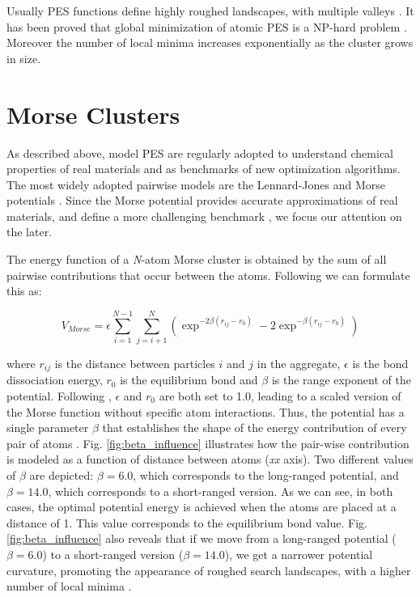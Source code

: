 Usually PES functions define highly roughed landscapes, with multiple valleys \cite{stillinger99}. It has been proved that global minimization of atomic PES is a NP-hard problem \cite{doye98, wille85}. Moreover the number of local minima increases exponentially as the cluster grows in size.




	\section{Morse Clusters}
	\label{sec:morse_clusters}
	
	As described above, model PES are regularly adopted to understand chemical properties of real materials and as benchmarks of new optimization algorithms. The most widely adopted pairwise models are the Lennard-Jones \cite{lennardJones31} and Morse potentials \cite{morse29}. Since the Morse potential provides accurate approximations of real materials, and define a more challenging benchmark \cite{braier90, smirnov99}, we focus our attention on the later.

	The energy function of a \emph{N}-atom Morse cluster is obtained by the sum of all pairwise contributions that occur between the atoms. Following \cite{doye97, morse29} we can formulate this as:
	
	\begin{equation} 
		\label{eq:morse_potential}
		V_{Morse} = \epsilon \sum_{i=1}^{N-1}\sum_{j=i+1}^{N} \left ( \exp^{-2\beta(r_{ij}-r_{0})} - 2\exp^{-\beta(r_{ij}-r_{0})} \right)
	\end{equation}


	\noindent where $r_{ij}$ is the distance between particles $i$ and $j$ in the aggregate, $\epsilon$ is the bond dissociation energy, $r_{0}$ is the equilibrium bond and $\beta$ is the range exponent of the potential. Following \cite{doye97}, $\epsilon$ and $r_{0}$ are both set to 1.0, leading to a scaled version of the Morse function without specific atom interactions. Thus, the potential has a single parameter $\beta$ that establishes the shape of the energy contribution of every pair of atoms \cite{doye04}. Fig. \ref{fig:beta_influence} illustrates how the pair-wise contribution is modeled as a function of distance between atoms (\emph{xx} axis). Two different values of $\beta$ are depicted: $\beta = 6.0$, which corresponds to the long-ranged potential, and $\beta = 14.0$, which corresponds to a short-ranged version. As we can see, in both cases, the optimal potential energy is achieved when the atoms are placed at a distance of 1. This value corresponds to the equilibrium bond value. Fig.\ref{fig:beta_influence} also reveals that if we move from a long-ranged potential ($\beta = 6.0$) to a short-ranged version ($\beta = 14.0$), we get a narrower potential curvature, promoting the appearance of roughed search landscapes, with a higher number of local minima \cite{doye04}.
	
	
	
	
	
	
	
	
	

